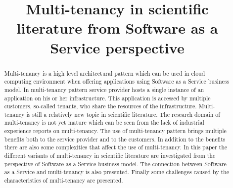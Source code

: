 \documentclass[conference]{sasmoota2017}
\begin{document}
%
\title{Multi-tenancy in scientific literature from Software as a Service perspective}


\author{
}


\maketitle

\begin{abstract}

Multi-tenancy is a high level architectural pattern which can be used in cloud computing environment when offering applications using Software as a Service business model. In multi-tenancy pattern service provider hosts a single instance of an application on his or her infrastructure. This application is accessed by multiple customers, so-called tenants, who share the resources of the infrastructure. Multi-tenancy is still a relatively new topic in scientific literature. The research domain of multi-tenancy is not yet mature which can be seen from the lack of industrial experience reports on multi-tenancy. The use of multi-tenancy pattern brings multiple benefits both to the service provider and to the customers. In addition to the benefits there are also some complexities that affect the use of multi-tenancy. In this paper the different variants of multi-tenancy in scientific literature are investigated from the perspective of Software as a Service business model. The connection between Software as a Service and multi-tenancy is also presented. Finally some challenges caused by the characteristics of multi-tenancy are presented. 

\end{abstract}
\end{document}
